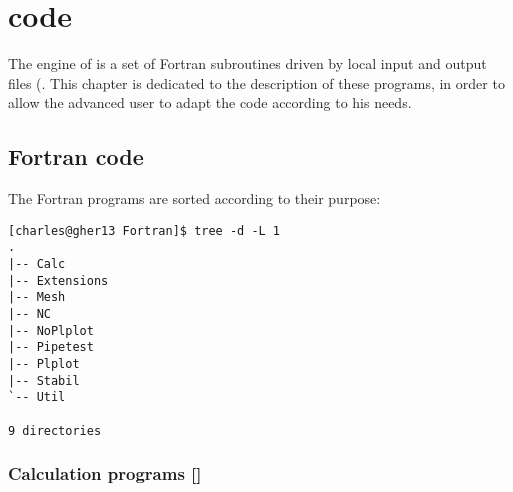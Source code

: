 \chapter[\diva code]{\diva code}
\hypertarget{DIVACODE}{}

The engine of \diva is a set of Fortran subroutines driven by local input and output files (.
This chapter is dedicated to the description of these programs, in order to allow the advanced user to adapt the code according to his needs.

\minitoc


\section[Fortran code]{Fortran code \expert}

The Fortran programs are sorted according to their purpose: 

\begin{lstlisting}[style=Bash]
[charles@gher13 Fortran]$ tree -d -L 1
.
|-- Calc
|-- Extensions
|-- Mesh
|-- NC
|-- NoPlplot
|-- Pipetest
|-- Plplot
|-- Stabil
`-- Util

9 directories
\end{lstlisting}

\subsection[Calculation programs]{Calculation programs []}

